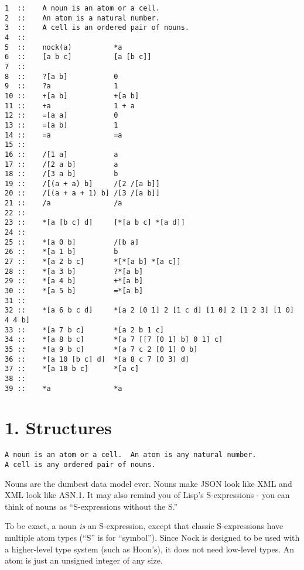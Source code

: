 \begin{framed_shaded}
\begin{Verbatim}[fontsize=\relsize{-2.5},fontseries=b,commandchars=\\\{\}]
1  ::    A noun is an atom or a cell.
2  ::    An atom is a natural number.
3  ::    A cell is an ordered pair of nouns.
4  ::
5  ::    nock(a)          *a
6  ::    [a b c]          [a [b c]]
7  ::
8  ::    ?[a b]           0
9  ::    ?a               1
10 ::    +[a b]           +[a b]
11 ::    +a               1 + a
12 ::    =[a a]           0
13 ::    =[a b]           1
14 ::    =a               =a
15 ::
16 ::    /[1 a]           a
17 ::    /[2 a b]         a
18 ::    /[3 a b]         b
19 ::    /[(a + a) b]     /[2 /[a b]]
20 ::    /[(a + a + 1) b] /[3 /[a b]]
21 ::    /a               /a
22 ::
23 ::    *[a [b c] d]     [*[a b c] *[a d]]
24 ::
25 ::    *[a 0 b]         /[b a]
26 ::    *[a 1 b]         b
27 ::    *[a 2 b c]       *[*[a b] *[a c]]
28 ::    *[a 3 b]         ?*[a b]
29 ::    *[a 4 b]         +*[a b]
30 ::    *[a 5 b]         =*[a b]
31 ::
32 ::    *[a 6 b c d]     *[a 2 [0 1] 2 [1 c d] [1 0] 2 [1 2 3] [1 0] 4 4 b]
33 ::    *[a 7 b c]       *[a 2 b 1 c]
34 ::    *[a 8 b c]       *[a 7 [[7 [0 1] b] 0 1] c]
35 ::    *[a 9 b c]       *[a 7 c 2 [0 1] 0 b]
36 ::    *[a 10 [b c] d]  *[a 8 c 7 [0 3] d]
37 ::    *[a 10 b c]      *[a c]
38 ::
39 ::    *a               *a
\end{Verbatim}
\end{framed_shaded}

\section{1. Structures}

\begin{framed_shaded}
\begin{Verbatim}[fontsize=\relsize{-2.5},fontseries=b,commandchars=\\\{\}]
A noun is an atom or a cell.  An atom is any natural number.
A cell is any ordered pair of nouns.
\end{Verbatim}
\end{framed_shaded}
Nouns are the dumbest data model ever.  Nouns make JSON look like XML and XML
look like ASN.1.  It may also remind you of Lisp's S-expressions - you can
think of nouns as ``S-expressions without the S.''

To be exact, a noun \emph{is} an S-expression, except that classic S-expressions
have multiple atom types (``S'' is for ``symbol'').  Since Nock is designed to be
used with a higher-level type system (such as Hoon's), it does not need
low-level types.  An atom is just an unsigned integer of any size.


